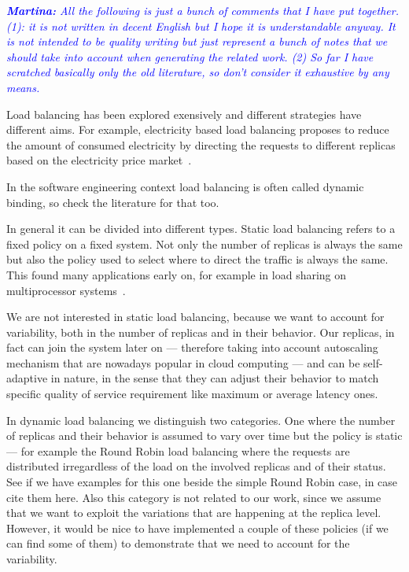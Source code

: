 \textcolor{blue}{\textit{\textbf{Martina:} All the following is just a
    bunch of comments that I have put together. (1): it is not written
    in decent English but I hope it is understandable anyway. It is
    not intended to be quality writing but just represent a bunch of
    notes that we should take into account when generating the related
    work. (2) So far I have scratched basically only the old
    literature, so don't consider it exhaustive by any means.}}

Load balancing has been explored exensively and different strategies
have different aims. For example, electricity based load balancing
proposes to reduce the amount of consumed electricity by directing the
requests to different replicas based on the electricity price
market~\cite{LoadBalancingForElectricity:TCC}.

In the software engineering context load balancing is often called
dynamic binding, so check the literature for that too.

In general it can be divided into different types. Static load
balancing refers to a fixed policy on a fixed system. Not only the
number of replicas is always the same but also the policy used to
select where to direct the traffic is always the same. This found many
applications early on, for example in load sharing on multiprocessor
systems~\cite{StaticLoadBalancing:TSE,StaticOptimal:ACM}.

We are not interested in static load balancing, because we want to
account for variability, both in the number of replicas and in their
behavior. Our replicas, in fact can join the system later on ---
therefore taking into account autoscaling mechanism that are nowadays
popular in cloud computing --- and can be self-adaptive in nature, in
the sense that they can adjust their behavior to match specific
quality of service requirement like maximum or average latency
ones. 

In dynamic load balancing we distinguish two categories. One where the
number of replicas and their behavior is assumed to vary over time but
the policy is static --- for example the Round Robin load balancing
where the requests are distributed irregardless of the load on the
involved replicas and of their status. See if we have examples for
this one beside the simple Round Robin case, in case cite them
here. Also this category is not related to our work, since we assume
that we want to exploit the variations that are happening at the
replica level. However, it would be nice to have implemented a couple
of these policies (if we can find some of them) to demonstrate that we
need to account for the variability.

